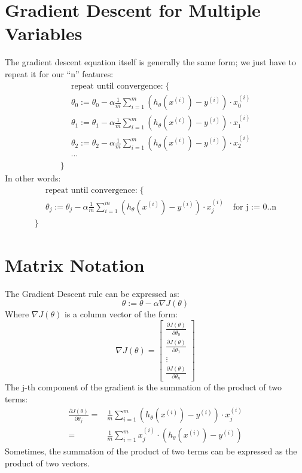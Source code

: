 \section*{Gradient Descent for Multiple Variables}
The gradient descent equation itself is generally the same form; we just have to repeat it for our ``n'' features:
\begin{align*}
& \text{repeat until convergence:} \; \lbrace \\ 
\; & \theta_0 := \theta_0 - \alpha \frac{1}{m} \sum\limits_{i=1}^{m} (h_\theta(x^{(i)}) - y^{(i)}) \cdot x_0^{(i)}\\
\; & \theta_1 := \theta_1 - \alpha \frac{1}{m} \sum\limits_{i=1}^{m} (h_\theta(x^{(i)}) - y^{(i)}) \cdot x_1^{(i)} \\
\; & \theta_2 := \theta_2 - \alpha \frac{1}{m} \sum\limits_{i=1}^{m} (h_\theta(x^{(i)}) - y^{(i)}) \cdot x_2^{(i)} \\
& \cdots
\\ \rbrace
\end{align*}
In other words:
\begin{align*}
& \text{repeat until convergence:} \; \lbrace \\ 
\; & \theta_j := \theta_j - \alpha \frac{1}{m} \sum\limits_{i=1}^{m} (h_\theta(x^{(i)}) - y^{(i)}) \cdot x_j^{(i)} \;  & \text{for j := 0..n}\\ 
\rbrace
\end{align*}
\section*{Matrix Notation}
The Gradient Descent rule can be expressed as:
\begin{equation}
\theta := \theta - \alpha \nabla J(\theta)
\end{equation}
Where $\nabla J(\theta)$ is a column vector of the form:
\begin{equation}
\nabla J(\theta)  = 
\begin{bmatrix}
\frac{\partial J(\theta)}{\partial \theta_0}   \\ \frac{\partial J(\theta)}{\partial \theta_1}   \\ \vdots   \\ \frac{\partial J(\theta)}{\partial \theta_n} 
\end{bmatrix}
\end{equation}
The j-th component of the gradient is the summation of the product of two terms:
\begin{align*}
\frac{\partial J(\theta)}{\partial \theta_j} =&  \frac{1}{m} \sum\limits_{i=1}^{m}  \left(h_\theta(x^{(i)}) - y^{(i)} \right) \cdot x_j^{(i)} \\
=& \frac{1}{m} \sum\limits_{i=1}^{m}   x_j^{(i)} \cdot \left(h_\theta(x^{(i)}) - y^{(i)}  \right) 
\end{align*}
Sometimes, the summation of the product of two terms can be expressed as the product of two vectors.


